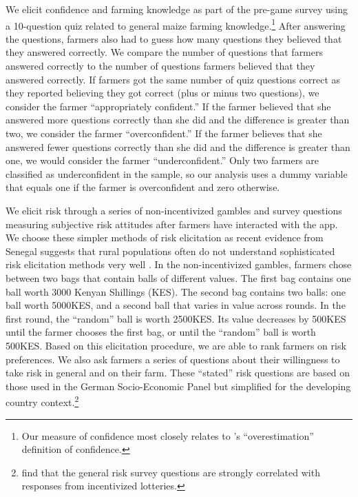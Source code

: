 \documentclass[12pt,letterpaper]{article}
\begin{document}
\noindent We elicit confidence and farming knowledge as part of the pre-game survey using a 10-question quiz related to general maize farming knowledge.\footnote{Our measure of confidence most closely relates to \citet{moore_trouble_2008}'s ``overestimation'' definition of confidence.} After answering the questions, farmers also had to guess how many questions they believed that they answered correctly. We compare the number of questions that farmers answered correctly to the number of questions farmers believed that they answered correctly. If farmers got the same number of quiz questions correct as they reported believing they got correct (plus or minus two questions), we consider the farmer ``appropriately confident.'' If the farmer believed that she answered more questions correctly than she did and the difference is greater than two, we consider the farmer ``overconfident.'' If the farmer believes that she answered fewer questions correctly than she did and the difference is greater than one, we would consider the farmer ``underconfident.'' Only two farmers are classified as underconfident in the sample, so our analysis uses a dummy variable that equals one if the farmer is overconfident and zero otherwise. 

We elicit risk through a series of non-incentivized gambles and survey questions measuring subjective risk attitudes after farmers have interacted with the app. We choose these simpler methods of risk elicitation as recent evidence from Senegal suggests that rural populations often do not understand sophisticated risk elicitation methods very well \citep{charness_comprehension_2012}. In the non-incentivized gambles, farmers chose between two bags that contain balls of different values. The first bag contains one ball worth 3000 Kenyan Shillings (KES). The second bag contains two balls: one ball worth 5000KES, and a second ball that varies in value across rounds. In the first round, the ``random'' ball is worth 2500KES. Its value decreases by 500KES until the farmer chooses the first bag, or until the ``random'' ball is worth 500KES. Based on this elicitation procedure, we are able to rank farmers on risk preferences. We also ask farmers a series of questions about their willingness to take risk in general and on their farm. These ``stated'' risk questions are based on those used in the German Socio-Economic Panel but simplified for the developing country context.\footnote{\citet{dohmen_individual_2011} find that the general risk survey questions are strongly correlated with responses from incentivized lotteries.}
\end{document}
